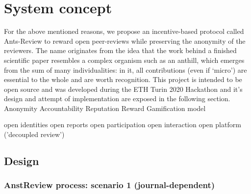 \documentclass[runningheads]{llncs}
\begin{document}
\section{System concept}
For the above mentioned reasons, we propose an incentive-based protocol called Ants-Review to reward open peer-reviews while preserving the anonymity of the reviewers. The name originates from the idea that the work behind a finished scientific paper resembles a complex organism such as an anthill, which emerges from the sum of many individualities: in it, all contributions (even if ‘micro’) are essential to the whole and are worth recognition.
This project is intended to be open source and was developed during the ETH Turin 2020 Hackathon and it’s design and attempt of implementation are exposed in the following section.
Anonymity
Accountability
Reputation
Reward
Gamification model 

open identities open reports open participation open interaction open platform ('decoupled review')

\subsection{Design}

\subsubsection{AnstReview process: scenario 1  (journal-dependent)}\\
\end{document}
